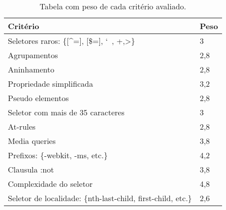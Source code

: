 \begin{table}[!htb]
	\centering
	\caption{Tabela com peso de cada critério avaliado.}
	\label{tab:tabelaPesos}
	\begin{tabular}{l|l}
		\textbf{Critério}                                                           & \textbf{Peso} \\ \hline
		Seletores raros: \{{[}\textasciicircum ={]}, {[}\$={]}, \char`~, +,\textgreater\} & 3             \\
		Agrupamentos                                                                & 2,8           \\
		Aninhamento                                                                 & 2,8           \\
		Propriedade simplificada                                                    & 3,2           \\
		Pseudo elementos                                                            & 2,8           \\
		Seletor com mais de 35 caracteres                                           & 3             \\
		At-rules                                                                    & 2,8           \\
		Media queries                                                               & 3,8           \\
		Prefixos: \{-webkit, -ms, etc.\}                                            & 4,2           \\
		Clausula :not                                                               & 3,8           \\
		Complexidade do seletor                                                     & 4,8           \\
		Seletor de localidade: \{nth-last-child, first-child, etc.\}                & 2,6          
	\end{tabular}
\end{table}